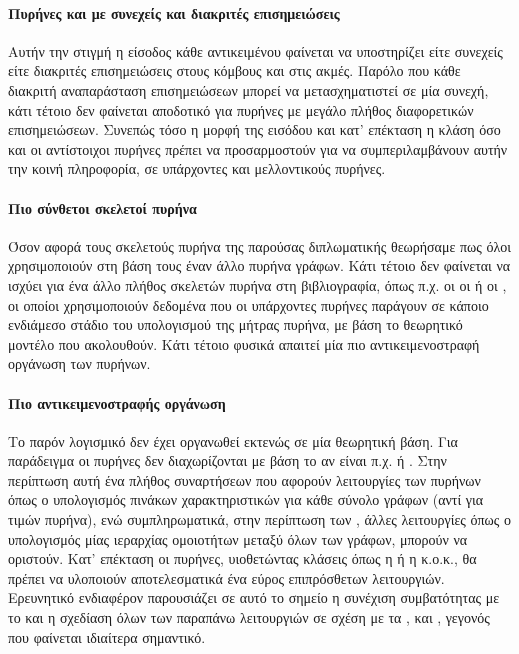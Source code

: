 \paragraph*{Πυρήνες και με συνεχείς και διακριτές επισημειώσεις}
Αυτήν την στιγμή η είσοδος κάθε αντικειμένου φαίνεται να υποστηρίζει είτε συνεχείς είτε διακριτές επισημειώσεις στους κόμβους και στις ακμές.
Παρόλο που κάθε διακριτή αναπαράσταση επισημειώσεων μπορεί να μετασχηματιστεί σε μία συνεχή, κάτι τέτοιο δεν φαίνεται αποδοτικό για πυρήνες με μεγάλο πλήθος διαφορετικών επισημειώσεων.
Συνεπώς τόσο η μορφή της εισόδου και κατ' επέκταση η κλάση  όσο και οι αντίστοιχοι πυρήνες πρέπει να προσαρμοστούν για να συμπεριλαμβάνουν αυτήν την κοινή πληροφορία, σε υπάρχοντες και μελλοντικούς πυρήνες.
\paragraph*{Πιο σύνθετοι σκελετοί πυρήνα}
Όσον αφορά τους σκελετούς πυρήνα της παρούσας διπλωματικής θεωρήσαμε πως όλοι χρησιμοποιούν στη βάση τους έναν άλλο πυρήνα γράφων.
Κάτι τέτοιο δεν φαίνεται να ισχύει για ένα άλλο πλήθος σκελετών πυρήνα στη βιβλιογραφία, όπως π.χ. οι οι  \cite{DGK_PINAR} ή οι  \cite{kriege_2016_otk}, οι οποίοι χρησιμοποιούν δεδομένα που οι υπάρχοντες πυρήνες παράγουν σε κάποιο ενδιάμεσο στάδιο του υπολογισμού της μήτρας πυρήνα, με βάση το θεωρητικό μοντέλο που ακολουθούν.
Κάτι τέτοιο φυσικά απαιτεί μία πιο αντικειμενοστραφή οργάνωση των πυρήνων.
\paragraph*{Πιο αντικειμενοστραφής οργάνωση}
Το παρόν λογισμικό δεν έχει οργανωθεί εκτενώς σε μία θεωρητική βάση.
Για παράδειγμα οι πυρήνες δεν διαχωρίζονται με βάση το αν είναι π.χ.  \cite{vishwanathan2010graph} ή  \cite{Frohlich2005}.
Στην περίπτωση αυτή ένα πλήθος συναρτήσεων που αφορούν λειτουργίες των  πυρήνων όπως ο υπολογισμός πινάκων χαρακτηριστικών για κάθε σύνολο γράφων (αντί για τιμών πυρήνα), ενώ συμπληρωματικά, στην περίπτωση των , άλλες λειτουργίες όπως ο υπολογισμός μίας ιεραρχίας ομοιοτήτων μεταξύ όλων των γράφων, μπορούν να οριστούν.
Κατ' επέκταση οι πυρήνες, υιοθετώντας κλάσεις όπως η  ή η  κ.ο.κ., θα πρέπει να υλοποιούν αποτελεσματικά ένα εύρος επιπρόσθετων λειτουργιών.
Ερευνητικό ενδιαφέρον παρουσιάζει σε αυτό το σημείο η συνέχιση συμβατότητας με το  και η σχεδίαση όλων των παραπάνω λειτουργιών σε σχέση με τα ,  και , γεγονός που φαίνεται ιδιαίτερα σημαντικό.

